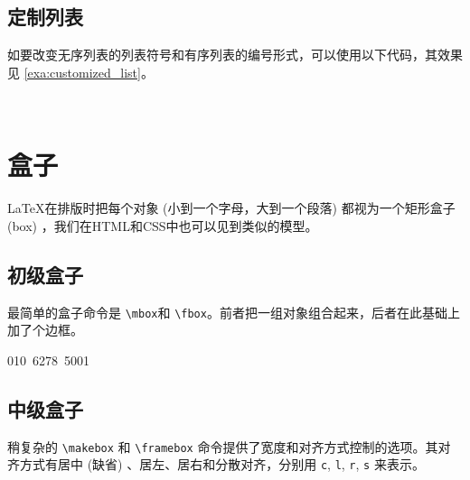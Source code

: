 \subsection{定制列表}

如要改变无序列表的列表符号和有序列表的编号形式，可以使用以下代码，其效果见 \autoref{exa:customized_list}。

\begin{Code}[]
\renewcommand{\labelitemi}{-}
\renewcommand{\theenumi}{\alph{enumi}}
\end{Code}

\renewcommand{\labelitemi}{-}
\renewcommand{\theenumi}{\alph{enumi}}

\begin{example}[h]
\\
\caption{定制列表}
\label{exa:customized_list}
\end{example}

\renewcommand{\labelitemi}{\ensuremath{\bullet}}
\renewcommand{\theenumi}{\arabic{enumi}}

\section{盒子}
\label{sec:box}

\LaTeX 在排版时把每个对象 (小到一个字母，大到一个段落) 都视为一个矩形盒子 (box) ，我们在HTML和CSS中也可以见到类似的模型。

\subsection{初级盒子}

最简单的盒子命令是 \verb|\mbox|和 \verb|\fbox|。前者把一组对象组合起来，后者在此基础上加了个边框。

\begin{example}[h]
\begin{RLDemo}[]
\mbox{010 6278 5001}
\end{RLDemo}
\caption{ \texttt{mbox}和 \texttt{fbox}}
\label{exa:mbox}
\end{example}

\subsection{中级盒子}

稍复杂的 \verb|\makebox| 和 \verb|\framebox| 命令提供了宽度和对齐方式控制的选项。其对齐方式有居中 (缺省) 、居左、居右和分散对齐，分别用 \texttt{c}, \texttt{l}, \texttt{r}, \texttt{s} 来表示。

